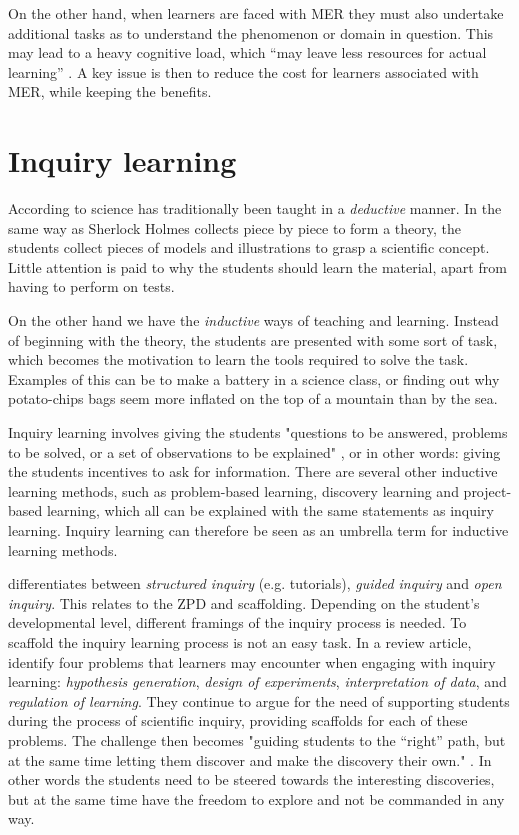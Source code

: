 On the other hand, when learners are faced with MER they must also undertake additional tasks as to understand the phenomenon or domain in question. This may lead to a heavy cognitive load, which “may leave less resources for actual learning” \citetext{Sweller, 1988, 1989, referenced in \citealp{van2006supporting}}. A key issue is then to reduce the cost for learners associated with MER, while keeping the benefits. 

\section{Inquiry learning}
According to \citet{prince2006inductive} science has traditionally been taught in a \textit{deductive} manner. In the same way as Sherlock Holmes collects piece by piece to form a theory, the students collect pieces of models and illustrations to grasp a scientific concept. Little attention is paid to why the students should learn the material, apart from having to perform on tests.

On the other hand we have the \textit{inductive} ways of teaching and learning. Instead of beginning with the theory, the students are presented with some sort of task, which becomes the motivation to learn the tools required to solve the task. Examples of this can be to make a battery in a science class, or finding out why potato-chips bags seem more inflated on the top of a mountain than by the sea.

Inquiry learning involves giving the students "questions to be answered, problems to be solved, or a set of observations to be explained" \citep{prince2006inductive}, or in other words: giving the students incentives to ask for information. There are several other inductive learning methods, such as problem-based learning, discovery learning and project-based learning, which all can be explained with the same statements as inquiry learning. Inquiry learning can therefore be seen as an umbrella term for inductive learning methods. \citep{prince2006inductive}

\citeauthor*{staver1987analysis} \citetext{\citeyear{staver1987analysis}, referenced in \citealp{prince2006inductive}} differentiates between \emph{structured inquiry} (e.g. tutorials), \emph{guided inquiry} and \emph{open inquiry}. This relates to the ZPD and scaffolding. Depending on the student's developmental level, different framings of the inquiry process is needed. To scaffold the inquiry learning process is not an easy task. In a review article, \citet{de1998scientific} identify four problems that learners may encounter when engaging with inquiry learning: \textit{hypothesis generation}, \textit{design of experiments}, \textit{interpretation of data}, and \textit{regulation of learning}. They continue to argue for the need of supporting students during the process of scientific inquiry, providing scaffolds for each of these problems. The challenge then becomes "guiding students to the “right” path, but at the
same time letting them discover and make the discovery their own." \citep[p. 247]{kluge2010simulation}. In other words the students need to be steered towards the interesting discoveries, but at the same time have the freedom to explore and not be commanded in any way.

